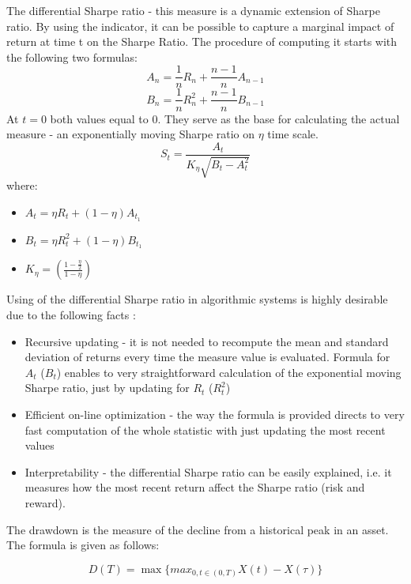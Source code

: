 \documentclass{pracamgr_wne}\usepackage[]{graphicx}\usepackage[]{color}
\begin{document}
The differential Sharpe ratio - this measure is a dynamic extension of Sharpe ratio. By using the indicator, it can be possible to capture a marginal impact of return at time t on the Sharpe Ratio. The procedure of computing it starts with the following two formulas:
\begin{equation}
A_n=\frac{1}{n}R_n+\frac{n-1}{n}A_{n-1}
\end{equation}
\begin{equation}
B_n=\frac{1}{n}R_n^2+\frac{n-1}{n}B_{n-1}
\end{equation}
At $t=0$ both values equal to 0. They serve as the base for calculating the actual measure - an exponentially moving Sharpe ratio on $\eta$ time scale.
\begin{equation}
S_t=\frac{A_t}{K_\eta\sqrt{B_t-A_t^2}}
\end{equation}
where:
\begin{itemize}
\item $A_t=\eta R_t+(1-\eta)A_{t_1} $ 
\item $B_t=\eta R_t^2+(1-\eta)B_{t_1} $ 
\item $K_\eta=(\frac{1-\frac{\eta}{2}}{1-\eta})$
\end{itemize}

Using of the differential Sharpe ratio in algorithmic systems is highly desirable due to the following facts \parencite{Moody1997}:
\begin{itemize}
\item Recursive updating - it is not needed to recompute the mean and standard deviation of returns every time the measure value is evaluated. 
Formula for $A_t$ ($B_t$) enables to very straightforward calculation of the exponential moving Sharpe ratio, just by updating for  $R_t$ ($R_t^2$)
\item Efficient on-line optimization - the way the formula is provided directs to very fast computation of the whole statistic with just updating the most recent values
\item Interpretability - the differential Sharpe ratio can be easily explained, i.e. it measures how the most recent return affect the Sharpe ratio (risk and reward).
\end{itemize}


The drawdown is the measure of the decline from a historical peak in an asset.
The formula is given as follows:

\begin{equation}
D(T)=\max\{max_{0, t\in (0,T)} X(t)-X(\tau)\}
\end{equation}
\end{document}
